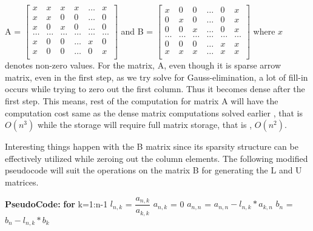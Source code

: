 \documentclass{article}
\newcommand\pseudoCode{\vspace{.10in}\textbf{PseudoCode: }}
\begin{document}
A = $\begin{bmatrix} 
x & x & x & x & \dots & x \\
x & x & 0 & 0 & \dots & 0 \\
x & 0 & x & 0 & \dots& 0 \\
\dots & \dots & \dots & \dots & \dots & \dots \\
x & 0 & 0 & \dots & x & 0 \\
x & 0 & 0 & \dots & 0 & x \\
\end{bmatrix}$ and 
B = $\begin{bmatrix}
x & 0 & 0 & \dots & 0 & x \\
0 & x & 0 & \dots & 0 & x \\
0 & 0 & x & \dots & 0 & x \\
\dots & \dots & \dots & \dots & \dots & \dots \\
0 & 0 & 0 & \dots & x & x \\
x & x & x & \dots & x & x \\
\end{bmatrix}$ where $x$ denotes non-zero values. \newline 
For the matrix, A, even though it is sparse arrow matrix, even in the first step, as we try solve for Gauss-elimination, a lot of fill-in occurs while trying to zero out the first column. Thus it becomes dense after the first step. This means, rest of the computation for matrix A will have the computation cost same as the dense matrix computations solved earlier , that is $O(n^3)$ while the storage will require full matrix storage, that is , $O(n^2)$. \newline

Interesting things happen with the B matrix since its sparsity structure can be effectively utilized while zeroing out the column elements. The following modified pseudocode will suit the operations on the matrix B for generating the L and U matrices. \newline

\pseudoCode \newline
\hspace*{0.5cm} \textbf {for} k=1:n-1 \newline
\hspace*{1cm}        $l_{n,k}$ = $\dfrac{a_{n,k}}{a_{k,k}}$ \newline
\hspace*{1cm}        $a_{n,k}$ = 0 \newline
\hspace*{1cm}        $a_{n,n}$ = $a_{n,n} - l_{n,k}*a_{k,n}$ \newline
\hspace*{1cm}        $b_{n}$  = $b_{n} - l_{n,k}*b_{k}$ \newline
\end{document}
